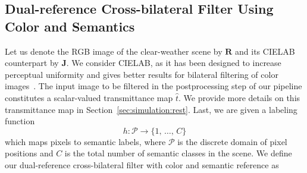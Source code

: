 \documentclass[twocolumn]{svjour3}          \smartqed  \usepackage{graphicx}
\begin{document}
\subsection{Dual-reference Cross-bilateral Filter Using Color and Semantics}
\label{sec:simulation:dual_bilateral}

Let us denote the RGB image of the clear-weather scene by $\mathbf{R}$ and its CIELAB counterpart by $\mathbf{J}$. We consider CIELAB, as it has been designed to increase perceptual uniformity and gives better results for bilateral filtering of color images~\cite{bilateral:grid}. The input image to be filtered in the postprocessing step of our pipeline constitutes a scalar-valued transmittance map $\hat{t}$. We provide more details on this transmittance map in Section~\ref{sec:simulation:rest}. Last, we are given a labeling function
\begin{equation} \label{eq:labeling}
h: \mathcal{P} \to \{1,\,\dots,\,C\}
\end{equation}
which maps pixels to semantic labels, where $\mathcal{P}$ is the discrete domain of pixel positions and $C$ is the total number of semantic classes in the scene. We define our dual-reference cross-bilateral filter with color and semantic reference as
\end{document}
